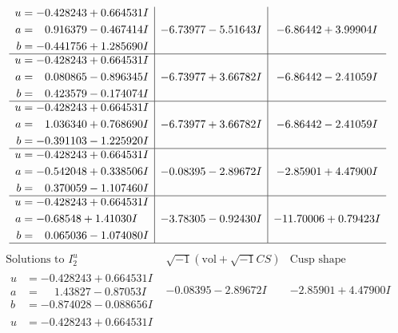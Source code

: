 \documentclass[1p]{elsarticle_modified}
\theoremstyle{definition}
\newcommand{\I}{\sqrt{-1}}
\begin{document}
$$\begin{array}{c|c|c}
\begin{aligned}
u &= -0.428243 + 0.664531 I \\
a &= \phantom{-}0.916379 - 0.467414 I \\
b &= -0.441756 + 1.285690 I\end{aligned}
 & -6.73977 - 5.51643 I & -6.86442 + 3.99904 I \\ \hline\begin{aligned}
u &= -0.428243 + 0.664531 I \\
a &= \phantom{-}0.080865 - 0.896345 I \\
b &= \phantom{-}0.423579 - 0.174074 I\end{aligned}
 & -6.73977 + 3.66782 I & -6.86442 - 2.41059 I \\ \hline\begin{aligned}
u &= -0.428243 + 0.664531 I \\
a &= \phantom{-}1.036340 + 0.768690 I \\
b &= -0.391103 - 1.225920 I\end{aligned}
 & -6.73977 + 3.66782 I & -6.86442 - 2.41059 I \\ \hline\begin{aligned}
u &= -0.428243 + 0.664531 I \\
a &= -0.542048 + 0.338506 I \\
b &= \phantom{-}0.370059 - 1.107460 I\end{aligned}
 & -0.08395 - 2.89672 I & -2.85901 + 4.47900 I \\ \hline\begin{aligned}
u &= -0.428243 + 0.664531 I \\
a &= -0.68548 + 1.41030 I \\
b &= \phantom{-}0.065036 - 1.074080 I\end{aligned}
 & -3.78305 - 0.92430 I & -11.70006 + 0.79423 I\\
 \hline 
 \end{array}$$\newpage$$\begin{array}{c|c|c}  
\text{Solutions to }I^u_{2}& \I (\text{vol} + \sqrt{-1}CS) & \text{Cusp shape}\\
 \hline 
\begin{aligned}
u &= -0.428243 + 0.664531 I \\
a &= \phantom{-}1.43827 - 0.87053 I \\
b &= -0.874028 - 0.088656 I\end{aligned}
 & -0.08395 - 2.89672 I & -2.85901 + 4.47900 I \\ \hline\begin{aligned}
u &= -0.428243 + 0.664531 I \\

\end{aligned}
\end{array}$$
\end{document}
